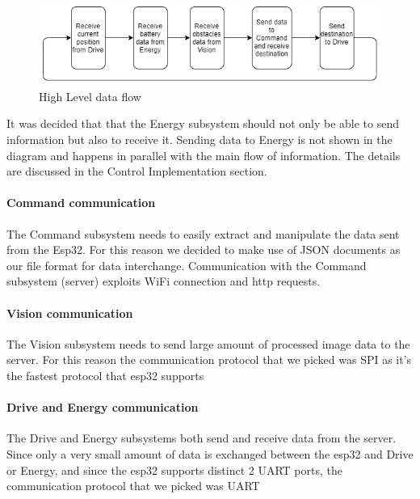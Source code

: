 \documentclass[10pt,twoside]{article}
\begin{document}
\begin{figure}[hbt!]
    \centering
    \includegraphics[scale=0.35]{esp32_flowchart.png}
    \captionsetup{justification=centering}
    \caption{High Level data flow}
\end{figure}
 
It was decided that that the Energy subsystem should not only be able to send information but also to receive it. Sending data to Energy is not shown in the diagram and happens in parallel with the main flow of information. The details are discussed in the Control Implementation section.

\paragraph{Command communication}
The Command subsystem needs to easily extract and manipulate the data sent from the Esp32. For this reason we decided to make use of JSON documents as our file format for data interchange. Communication with the Command subsystem (server) exploits WiFi connection and http requests.

\paragraph{Vision communication}
The Vision subsystem needs to send large amount of processed image data to the server. For this reason the communication protocol that we picked was SPI as it's the fastest protocol that esp32 supports

\paragraph{Drive and Energy communication}
The Drive and Energy subsystems both send and receive data from the server. Since only a very small amount of data is exchanged between the esp32 and Drive or Energy, and since the esp32 supports distinct 2 UART ports, the communication protocol that we picked was UART
\end{document}
